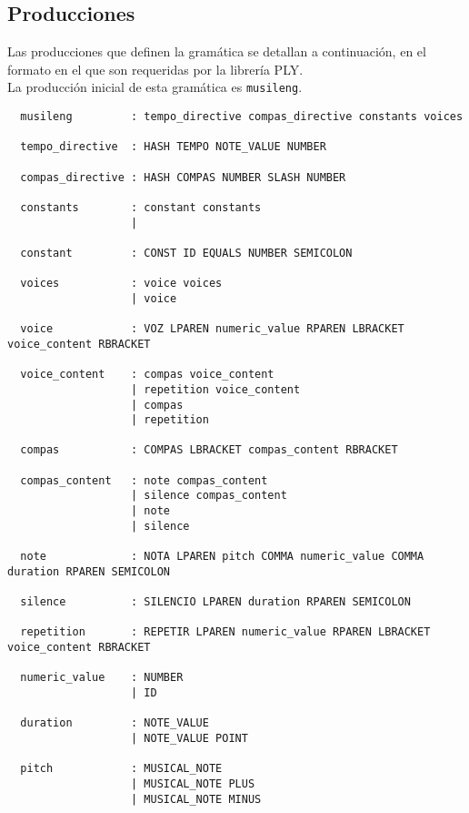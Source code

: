 \documentclass[a4paper,8pt]{article}
\begin{document}
\subsection{Producciones}
Las producciones que definen la gramática se detallan a continuación, en el formato en el que son requeridas por la librería PLY. \\La producción inicial de esta gramática es \texttt{musileng}.

\begin{verbatim}
  musileng         : tempo_directive compas_directive constants voices

  tempo_directive  : HASH TEMPO NOTE_VALUE NUMBER
  
  compas_directive : HASH COMPAS NUMBER SLASH NUMBER
  
  constants        : constant constants
                   | 
                   
  constant         : CONST ID EQUALS NUMBER SEMICOLON
  
  voices           : voice voices
                   | voice
                   
  voice            : VOZ LPAREN numeric_value RPAREN LBRACKET voice_content RBRACKET
  
  voice_content    : compas voice_content
                   | repetition voice_content
                   | compas
                   | repetition
                   
  compas           : COMPAS LBRACKET compas_content RBRACKET
  
  compas_content   : note compas_content
                   | silence compas_content
                   | note
                   | silence
                   
  note             : NOTA LPAREN pitch COMMA numeric_value COMMA duration RPAREN SEMICOLON
  
  silence          : SILENCIO LPAREN duration RPAREN SEMICOLON
  
  repetition       : REPETIR LPAREN numeric_value RPAREN LBRACKET voice_content RBRACKET
  
  numeric_value    : NUMBER
                   | ID
                   
  duration         : NOTE_VALUE
                   | NOTE_VALUE POINT
                   
  pitch            : MUSICAL_NOTE
                   | MUSICAL_NOTE PLUS
                   | MUSICAL_NOTE MINUS
\end{verbatim}
\end{document}
